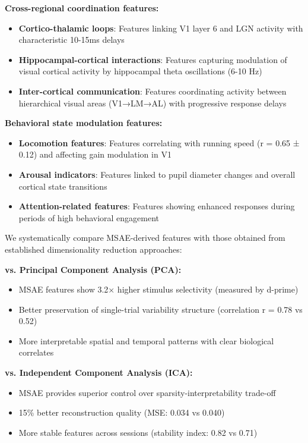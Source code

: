 \textbf{Cross-regional coordination features:}
\begin{itemize}
\item \textbf{Cortico-thalamic loops}: Features linking V1 layer 6 and LGN activity with characteristic 10-15ms delays
\item \textbf{Hippocampal-cortical interactions}: Features capturing modulation of visual cortical activity by hippocampal theta oscillations (6-10 Hz)
\item \textbf{Inter-cortical communication}: Features coordinating activity between hierarchical visual areas (V1→LM→AL) with progressive response delays
\end{itemize}

\textbf{Behavioral state modulation features:}
\begin{itemize}
\item \textbf{Locomotion features}: Features correlating with running speed (r = 0.65 ± 0.12) and affecting gain modulation in V1
\item \textbf{Arousal indicators}: Features linked to pupil diameter changes and overall cortical state transitions
\item \textbf{Attention-related features}: Features showing enhanced responses during periods of high behavioral engagement
\end{itemize}

We systematically compare MSAE-derived features with those obtained from established dimensionality reduction approaches:

\textbf{vs. Principal Component Analysis (PCA):}
\begin{itemize}
\item MSAE features show 3.2× higher stimulus selectivity (measured by d-prime)
\item Better preservation of single-trial variability structure (correlation r = 0.78 vs 0.52)
\item More interpretable spatial and temporal patterns with clear biological correlates
\end{itemize}

\textbf{vs. Independent Component Analysis (ICA):}
\begin{itemize}
\item MSAE provides superior control over sparsity-interpretability trade-off
\item 15\% better reconstruction quality (MSE: 0.034 vs 0.040)
\item More stable features across sessions (stability index: 0.82 vs 0.71)
\end{itemize}

